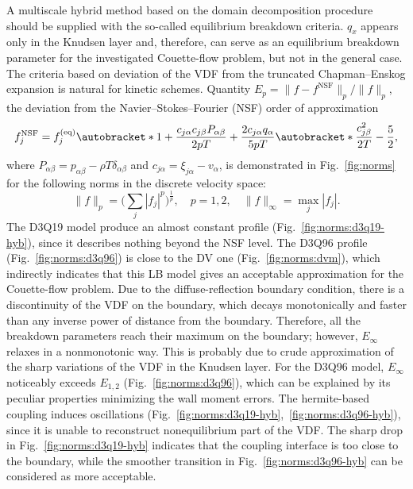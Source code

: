 \documentclass{aip-cp}
\DeclarePairedDelimiter\autobracket()       %
\newcommand{\br}[1]{\autobracket*{#1}}
\newcommand{\xiai}{\xi_{j \alpha}}
\newcommand{\cai}{c_{j \alpha}}
\newcommand{\caj}{c_{j \beta}}
\newcommand{\equil}[1]{#1^\mathrm{(eq)}}
\begin{document}
A multiscale hybrid method based on the domain decomposition procedure should be supplied with the so-called equilibrium breakdown criteria.
\(q_x\) appears only in the Knudsen layer and, therefore, can serve as an equilibrium breakdown parameter
for the investigated Couette-flow problem, but not in the general case.
The criteria based on deviation of the VDF from the truncated Chapman--Enskog expansion is natural for kinetic schemes.
Quantity \(E_p=\|f-f^{\mathrm{NSF}}\|_p/\|f\|_p\), the deviation from the Navier--Stokes--Fourier (NSF) order of approximation~\cite{Zhang2014}
\begin{equation}\label{eq:NSF}
    f^{\mathrm{NSF}}_j = \equil{f}_j\br{
        1 + \frac{\cai\caj P_{\alpha\beta}}{2pT} + \frac{2\cai q_\alpha}{5pT}\br{\frac{\caj^2}{2T} - \frac52} },
\end{equation}
where \(P_{\alpha\beta} = p_{\alpha\beta} - \rho T\delta_{\alpha\beta}\) and \(\cai = \xiai - v_\alpha\),
is demonstrated in Fig.~\ref{fig:norms} for the following norms in the discrete velocity space:
\begin{equation}\label{eq:norms}
    \|f\|_p = \bigg(\sum_j |f_j|^p \bigg)^\frac1p, \quad p=1,2, \quad \|f\|_\infty = \max_j |f_j|.
\end{equation}
The D3Q19 model produce an almost constant profile (Fig.~\ref{fig:norms:d3q19-hyb}),
since it describes nothing beyond the NSF level.
The D3Q96 profile (Fig.~\ref{fig:norms:d3q96}) is close to the DV one (Fig.~\ref{fig:norms:dvm}),
which indirectly indicates that this LB model gives an acceptable approximation for the Couette-flow problem.
Due to the diffuse-reflection boundary condition, there is a discontinuity of the VDF on the boundary,
which decays monotonically and faster than any inverse power of distance from the boundary.
Therefore, all the breakdown parameters reach their maximum on the boundary;
however, \(E_\infty\) relaxes in a nonmonotonic way.
This is probably due to crude approximation of the sharp variations of the VDF in the Knudsen layer.
For the D3Q96 model, \(E_\infty\) noticeably exceeds \(E_{1,2}\) (Fig.~\ref{fig:norms:d3q96}),
which can be explained by its peculiar properties minimizing the wall moment errors.
The hermite-based coupling induces oscillations (Fig.~\ref{fig:norms:d3q19-hyb},~\ref{fig:norms:d3q96-hyb}),
since it is unable to reconstruct nonequilibrium part of the VDF.
The sharp drop in Fig.~\ref{fig:norms:d3q19-hyb} indicates that the coupling interface is too close to the boundary,
while the smoother transition in Fig.~\ref{fig:norms:d3q96-hyb} can be considered as more acceptable.
\end{document}
